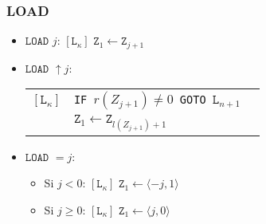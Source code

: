 \documentclass[twoside]{article}
\begin{document}
\subsubsection{LOAD}
\begin{itemize}
\item $\texttt{LOAD }j$: 
$[\texttt{L}_\kappa]\texttt{ Z}_{1}\leftarrow\texttt{Z}_{j+1}$

\item $\texttt{LOAD }\uparrow j$:

\begin{tabular}{l l l}
$[\texttt{L}_\kappa]$&\texttt{IF }$r(Z_{j+1})\neq 0$\texttt{ GOTO }$\texttt{L}_{n+1}$&\\
& $\texttt{Z}_{1}\leftarrow\texttt{Z}_{l(Z_{j+1})+1}$ 
\end{tabular}
\item $\texttt{LOAD }=j$:
\begin{itemize}
\item Si $j< 0$:
$[\texttt{L}_\kappa]\texttt{ Z}_{1}\leftarrow \langle -j,1\rangle$
\item Si $j\geq 0$:
$[\texttt{L}_\kappa]\texttt{ Z}_{1}\leftarrow \langle j,0\rangle$
\end{itemize}
\end{itemize}
\end{document}
